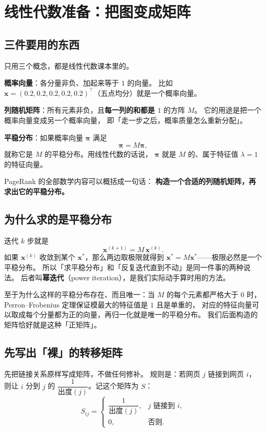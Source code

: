 \documentclass[UTF8,11pt,fontset=macnew]{ctexart}
\newcommand{\xv}{\mathbf{x}}
\begin{document}
\section{线性代数准备：把图变成矩阵}
\label{sec:matrix}

\subsection{三件要用的东西}

只用三个概念，都是线性代数课本里的。

\begin{keybox}[三个概念]
\textbf{概率向量}：各分量非负、加起来等于 $1$ 的向量。
比如 $\xv=(0.2,0.2,0.2,0.2,0.2)^\top$（五点均分）就是一个概率向量。

\textbf{列随机矩阵}：所有元素非负，且\textbf{每一列的和都是 $1$} 的方阵 $M$。
它的用途是把一个概率向量变成另一个概率向量，
即「走一步之后，概率质量怎么重新分配」。

\textbf{平稳分布}：如果概率向量 $\boldsymbol{\pi}$ 满足
\[
\boldsymbol{\pi} = M\boldsymbol{\pi},
\]
就称它是 $M$ 的平稳分布。用线性代数的话说，
$\boldsymbol{\pi}$ 就是 $M$ 的、属于特征值 $\lambda = 1$ 的特征向量。
\end{keybox}

PageRank 的全部数学内容可以概括成一句话：
\textbf{构造一个合适的列随机矩阵，再求出它的平稳分布。}

\subsection{为什么求的是平稳分布}

迭代 $k$ 步就是
\[
\xv^{(k+1)} = M\,\xv^{(k)} .
\]
如果 $\xv^{(k)}$ 收敛到某个 $\xv^*$，那么两边取极限就得到
$\xv^* = M\xv^*$——极限必然是一个平稳分布。
所以「求平稳分布」和「反复迭代直到不动」是同一件事的两种说法。
后者叫\textbf{幂迭代}（power iteration），是我们实际动手算时用的方法。

至于为什么这样的平稳分布存在、而且唯一：当 $M$ 的每个元素都严格大于 $0$
时，Perron--Frobenius 定理保证模最大的特征值是 $1$ 且是单重的，
对应的特征向量可以取成每个分量都为正的向量，再归一化就是唯一的平稳分布。
我们后面构造的矩阵恰好就是这种「正矩阵」。

\subsection{先写出「裸」的转移矩阵}

先把链接关系原样写成矩阵，不做任何修补。
规则是：若网页 $j$ 链接到网页 $i$，则让 $i$ 分到 $j$ 的
$\dfrac{1}{\text{出度}(j)}$。记这个矩阵为 $S$：
\[
S_{ij} =
\begin{cases}
\dfrac{1}{\text{出度}(j)}, & j \text{ 链接到 } i,\\[2mm]
0, & \text{否则}.
\end{cases}
\]
\end{document}
